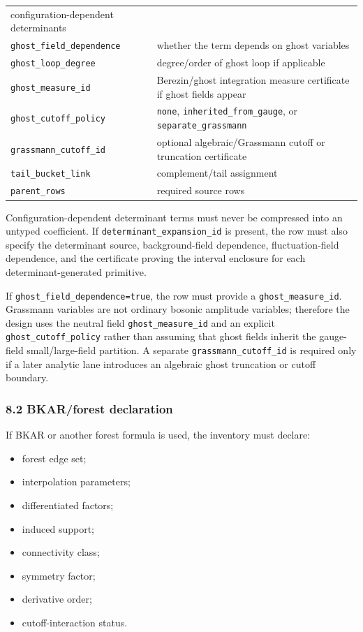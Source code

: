 \documentclass[
]{article}
\providecommand{\tightlist}{%
  \setlength{\itemsep}{0pt}\setlength{\parskip}{0pt}}
\begin{document}
\begin{longtable}[]{@{}
  >{\raggedright\arraybackslash}p{}
  >{\raggedright\arraybackslash}p{}@{}}
configuration-dependent determinants \\
\texttt{ghost\_field\_dependence} & whether the term depends on ghost
variables \\
\texttt{ghost\_loop\_degree} & degree/order of ghost loop if
applicable \\
\texttt{ghost\_measure\_id} & Berezin/ghost integration measure
certificate if ghost fields appear \\
\texttt{ghost\_cutoff\_policy} & \texttt{none},
\texttt{inherited\_from\_gauge}, or \texttt{separate\_grassmann} \\
\texttt{grassmann\_cutoff\_id} & optional algebraic/Grassmann cutoff or
truncation certificate \\
\texttt{tail\_bucket\_link} & complement/tail assignment \\
\texttt{parent\_rows} & required source rows \\
\end{longtable}

Configuration-dependent determinant terms must never be compressed into
an untyped coefficient. If \texttt{determinant\_expansion\_id} is
present, the row must also specify the determinant source,
background-field dependence, fluctuation-field dependence, and the
certificate proving the interval enclosure for each
determinant-generated primitive.

If \texttt{ghost\_field\_dependence=true}, the row must provide a
\texttt{ghost\_measure\_id}. Grassmann variables are not ordinary
bosonic amplitude variables; therefore the design uses the neutral field
\texttt{ghost\_measure\_id} and an explicit
\texttt{ghost\_cutoff\_policy} rather than assuming that ghost fields
inherit the gauge-field small/large-field partition. A separate
\texttt{grassmann\_cutoff\_id} is required only if a later analytic lane
introduces an algebraic ghost truncation or cutoff boundary.

\subsubsection{8.2 BKAR/forest
declaration}\label{bkarforest-declaration}

If BKAR or another forest formula is used, the inventory must declare:

\begin{itemize}
\tightlist
\item
  forest edge set;
\item
  interpolation parameters;
\item
  differentiated factors;
\item
  induced support;
\item
  connectivity class;
\item
  symmetry factor;
\item
  derivative order;
\item
  cutoff-interaction status.
\end{itemize}
\end{document}
